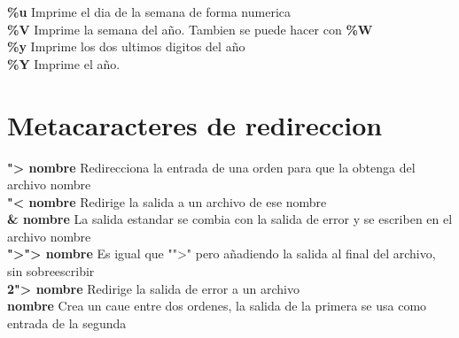 \documentclass[11pt]{article}
\begin{document}
\hspace{2cm} \textbf{\%u} \hspace{2cm} Imprime el dia de la semana de forma numerica\\

\hspace{2cm} \textbf{\%V} \hspace{2cm} Imprime la semana del a\~no. Tambien se puede hacer con \textbf{\%W}\\


\hspace{2cm} \textbf{\%y}\hspace{2cm} Imprime los dos ultimos digitos del a\~no\\

\hspace{2cm} \textbf{\%Y}\hspace{2cm} Imprime el a\~no.

\vspace{1cm}



\section{Metacaracteres de redireccion}
 
\textbf{ ">  nombre} \hspace{2cm} Redirecciona la entrada de una orden para que la obtenga del archivo nombre\\

\textbf{ "< nombre} \hspace{2cm} Redirige la salida a un archivo de ese nombre\\

\textbf{\& nombre} \hspace{2cm} La salida estandar se combia con la salida de error y se escriben en el archivo nombre \\

\textbf{">"> nombre} \hspace{2cm} Es igual que "">" pero añadiendo la salida al final del archivo, sin sobreescribir\\

\textbf{2"> nombre} \hspace{2cm} Redirige la salida de error a un archivo \\

\textbf{\textbar \hspace{0.25cm} nombre} \hspace{2cm}  Crea un caue entre dos ordenes, la salida de la primera se usa como entrada de la segunda \\
\end{document}

